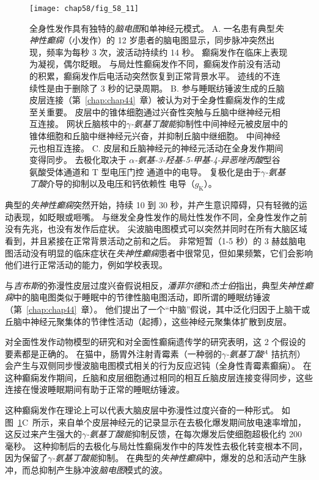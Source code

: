 \begin{figure}[htbp]
	\centering
	\texttt{[image: chap58/fig\_58\_11]}
	\caption{全身性发作具有独特的\textit{脑电图}和单神经元模式。
		A. 一名患有典型\textit{失神性癫痫}（小发作）的 12 岁患者的脑电图显示，同步脉冲突然出现，频率为每秒 3 次，波活动持续约 14 秒。
		癫痫发作在临床上表现为凝视，偶尔眨眼。
		与局灶性癫痫发作不同，癫痫发作前没有活动的积累，癫痫发作后电活动突然恢复到正常背景水平。
		迹线的不连续性是由于删除了 3 秒的记录周期\cite{lothman1990seizures}。
		B. 参与睡眠纺锤波生成的丘脑皮层连接（第~\ref{chap:chap44}~章）被认为对于全身性癫痫发作的生成至关重要。
		皮层中的锥体细胞通过兴奋性突触与丘脑中继神经元相互连接。
		网状丘脑核中的\textit{$\gamma$-氨基丁酸能}抑制性中间神经元被皮层中的锥体细胞和丘脑中继神经元兴奋，并抑制丘脑中继细胞。
		中间神经元也相互连接。 
		C. 皮层和丘脑神经元的神经元活动在全身发作期间变得同步。
		去极化取决于 \textit{$\alpha$-氨基-3-羟基-5-甲基-4-异恶唑丙酸}型谷氨酸受体通道和 T 型电压门控  通道中的电导。
		复极化是由于\textit{$\gamma$-氨基丁酸}介导的抑制以及电压和钙依赖性  电导（$ g_\text{K} $）\cite{lothman1993neurobiology}。}
	\label{fig:58_11}
\end{figure}


典型的\textit{失神性癫痫}突然开始，持续 10 到 30 秒，并产生意识障碍，只有轻微的运动表现，如眨眼或咂嘴。
与继发全身性发作的局灶性发作不同，全身性发作之前没有先兆，也没有发作后症状。
尖波脑电图模式可以突然并同时在所有大脑区域看到，并且紧接在正常背景活动之前和之后。
非常短暂（1-5 秒）的 3 赫兹脑电图活动没有明显的临床症状在\textit{失神性癫痫}患者中很常见，但如果频繁，它们会影响他们进行正常活动的能力，例如学校表现。


与\textit{吉布斯}的弥漫性皮层过度兴奋假说相反，\textit{潘菲尔德}和\textit{杰士伯}指出，典型\textit{失神性癫痫}中的脑电图类似于睡眠中的节律性脑电图活动，即所谓的睡眠纺锤波（第~\ref{chap:chap44}~章）。
他们提出了一个“中脑”假说，其中泛化归因于上脑干或丘脑中神经元聚集体的节律性活动（起搏），这些神经元聚集体扩散到皮层。


对全面性发作动物模型的研究和对全面性癫痫遗传学的研究表明，这 2 个假设的要素都是正确的。
在猫中，肠胃外注射青霉素（一种弱的\textit{$\gamma$-氨基丁酸}$^A$ 拮抗剂）会产生与双侧同步慢波脑电图模式相关的行为反应迟钝（全身性青霉素癫痫）。
在这种癫痫发作期间，丘脑和皮层细胞通过相同的相互丘脑皮层连接变得同步，这些连接在慢波睡眠期间有助于正常的睡眠纺锤波。


这种癫痫发作在理论上可以代表大脑皮层中弥漫性过度兴奋的一种形式。
如图~\ref{fig:58_11}C~所示，来自单个皮层神经元的记录显示在去极化爆发期间放电速率增加，这反过来产生强大的\textit{$\gamma$-氨基丁酸能}抑制反馈，在每次爆发后使细胞超极化约 200 毫秒。
这种抑制后的去极化与局灶性癫痫发作中的阵发性去极化转变根本不同，因为保留了\textit{$\gamma$-氨基丁酸能}抑制。
在典型的\textit{失神性癫痫}中，爆发的总和活动产生脉冲，而总抑制产生脉冲波\textit{脑电图}模式的波。


